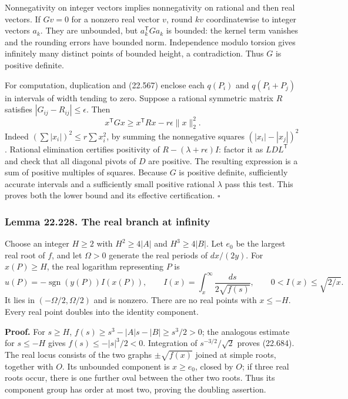\documentclass[
  11pt,
  a4paper,
]{article}
\begin{document}
Nonnegativity on integer vectors implies nonnegativity on rational and
then real vectors. If \(Gv=0\) for a nonzero real vector \(v\), round
\(kv\) coordinatewise to integer vectors \(a_k\). They are unbounded,
but \(a_k^{\mathsf T}Ga_k\) is bounded: the kernel term vanishes and the
rounding errors have bounded norm. Independence modulo torsion gives
infinitely many distinct points of bounded height, a contradiction. Thus
\(G\) is positive definite.

For computation, duplication and (22.567) enclose each \(q(P_i)\) and
\(q(P_i+P_j)\) in intervals of width tending to zero. Suppose a rational
symmetric matrix \(R\) satisfies \(|G_{ij}-R_{ij}|\le\epsilon\). Then \[
 x^{\mathsf T}Gx\ge x^{\mathsf T}Rx-r\epsilon\|x\|_2^2.
 \tag{22.683}
\] Indeed \((\sum|x_i|)^2\le r\sum x_i^2\), by summing the nonnegative
squares \((|x_i|-|x_j|)^2\). Rational elimination certifies positivity
of \(R-(\lambda+r\epsilon)I\): factor it as \(LDL^{\mathsf T}\) and
check that all diagonal pivots of \(D\) are positive. The resulting
expression is a sum of positive multiples of squares. Because \(G\) is
positive definite, sufficiently accurate intervals and a sufficiently
small positive rational \(\lambda\) pass this test. This proves both the
lower bound and its effective certification. \(\square\)

\subsubsection{Lemma 22.228. The real branch at
infinity}\label{lemma-22.228.-the-real-branch-at-infinity}

Choose an integer \(H\ge2\) with \(H^2\ge4|A|\) and \(H^3\ge4|B|\). Let
\(e_0\) be the largest real root of \(f\), and let \(\Omega>0\) generate
the real periods of \(dx/(2y)\). For \(x(P)\ge H\), the real logarithm
representing \(P\) is \[
 u(P)=-\operatorname{sgn}(y(P))I(x(P)),\qquad
 I(x)=\int_x^\infty\frac{ds}{2\sqrt{f(s)}},\qquad
 0<I(x)\le\sqrt{2/x}.
 \tag{22.684}
\] It lies in \((-\Omega/2,\Omega/2)\) and is nonzero. There are no real
points with \(x\le-H\). Every real point doubles into the identity
component.

\textbf{Proof.} For \(s\ge H\), \(f(s)\ge s^3-|A|s-|B|\ge s^3/2>0\); the
analogous estimate for \(s\le-H\) gives \(f(s)\le-|s|^3/2<0\).
Integration of \(s^{-3/2}/\sqrt2\) proves (22.684). The real locus
consists of the two graphs \(\pm\sqrt{f(x)}\) joined at simple roots,
together with \(O\). Its unbounded component is \(x\ge e_0\), closed by
\(O\); if three real roots occur, there is one further oval between the
other two roots. Thus its component group has order at most two, proving
the doubling assertion.
\end{document}
